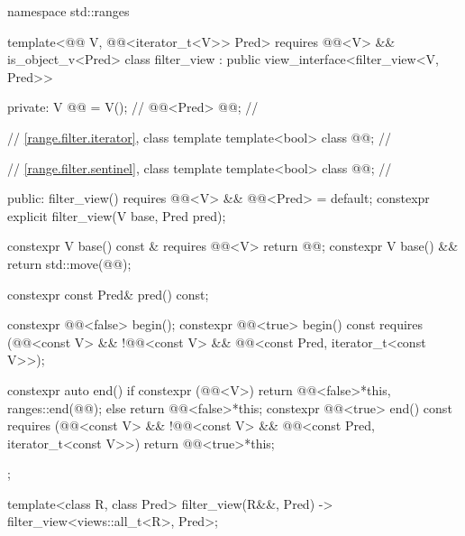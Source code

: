 %
%
%
\begin{codeblock}
namespace std::ranges {
  template<@@ V, @@<iterator_t<V>> Pred>
    requires @@<V> && is_object_v<Pred>
  class filter_view : public view_interface<filter_view<V, Pred>> {
  private:
    V @@ = V();                              // \expos
    @@<Pred> @@;                    // \expos

    // \ref{range.filter.iterator}, class template 
    template<bool> class @@;              // \expos

    // \ref{range.filter.sentinel}, class template 
    template<bool> class @@;              // \expos

  public:
    filter_view() requires @@<V> && @@<Pred> = default;
    constexpr explicit filter_view(V base, Pred pred);

    constexpr V base() const & requires @@<V> { return @@; }
    constexpr V base() && { return std::move(@@); }

    constexpr const Pred& pred() const;

    constexpr @@<false> begin();
    constexpr @@<true> begin() const
      requires (@@<const V> && !@@<const V> &&
                @@<const Pred, iterator_t<const V>>);

    constexpr auto end() {
      if constexpr (@@<V>)
        return @@<false>{*this, ranges::end(@@)};
      else
        return @@<false>{*this};
    }
    constexpr @@<true> end() const
      requires (@@<const V> && !@@<const V> &&
                @@<const Pred, iterator_t<const V>>) {
      return @@<true>{*this};
    }
  };

  template<class R, class Pred>
    filter_view(R&&, Pred) -> filter_view<views::all_t<R>, Pred>;
}
\end{codeblock}


